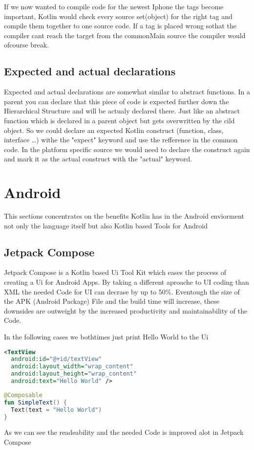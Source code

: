\documentclass[a4paper,11pt]{article}
\begin{document}
If we now wanted to compile code for the newest Iphone the tags become important, Kotlin would check every source set(object) for the right tag and compile them together to one source code. If a tag is placed wrong sothat the compiler cant reach the target from the commonMain source the compiler would ofcourse break.

\subsection{Expected and actual declarations}
Expected and actual declarations are somewhat similar to abstract functions. In a parent you can declare that this piece of code is expected further down the Hierarchical Structure and will be actualy declared there. Just like an abstract function which is declared in a parent object but gets overwritten by the cild object.
So we could declare an expected Kotlin construct (function, class, interface \ldots) withe the "expect" keyword and use the refference in the common code. In the platform specific source we would need to declare the construct again and mark it as the actual construct with the "actual" keyword.

\section{Android}
This sections concentrates on the benefits Kotlin has in the Android enviorment not only the language itself but also Kotlin based Tools for Android %

\subsection{Jetpack Compose}
Jetpack Compose is a Kotlin based Ui Tool Kit which eases the process of creating a Ui for Android Apps. By taking a different aproache to UI coding than XML the needed Code for UI can decrase by up to 50\%. Eventough the size of the APK (Android Package) File and the build time will increase, these downsides are outweight by the increased productivity and maintainability of the Code.

In the following cases we bothtimes just print Hello World to the Ui
\begin{lstlisting}[language=xml, title= {XML Hello World}]
<TextView
  android:id="@+id/textView"
  android:layout_width="wrap_content"
  android:layout_height="wrap_content"
  android:text="Hello World" />
\end{lstlisting}
\begin{lstlisting}[language=Kotlin, title= {Jetpack Compose Hello World}]
@Composable
fun SimpleText() {
  Text(text = "Hello World")
}
\end{lstlisting}
As we can see the readeability and the needed Code is improved alot in Jetpack Compose
\end{document}

